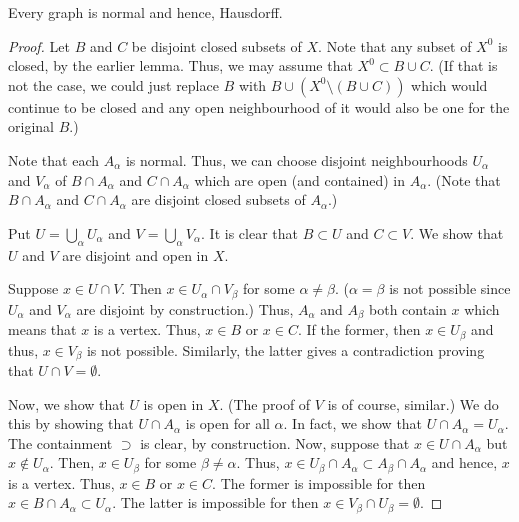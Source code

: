 \documentclass[12pt]{article}
\begin{document}
\begin{lem} 
	Every graph is normal and hence, Hausdorff.
\end{lem}
\begin{proof} 
	Let $B$ and $C$ be disjoint closed subsets of $X.$ Note that any subset of $X^0$ is closed, by the earlier lemma. Thus, we may assume that $X^0 \subset B \cup C.$ (If that is not the case, we could just replace $B$ with $B \cup (X^0 \setminus (B \cup C))$ which would continue to be closed and any open neighbourhood of it would also be one for the original $B.$)

	Note that each $A_\alpha$ is normal. Thus, we can choose disjoint neighbourhoods $U_\alpha$ and $V_\alpha$ of $B\cap A_\alpha$ and $C\cap A_\alpha$ which are open (and contained) in $A_\alpha.$ (Note that $B\cap A_\alpha$ and $C \cap A_\alpha$ are disjoint closed subsets of $A_\alpha.$)

	Put $U = \bigcup_{\alpha} U_\alpha$ and $V = \bigcup_{\alpha} V_\alpha.$ It is clear that $B \subset U$ and $C \subset V.$ We show that $U$ and $V$ are disjoint and open in $X.$

	Suppose $x \in U \cap V.$ Then $x \in U_\alpha \cap V_\beta$ for some $\alpha \neq \beta.$ ($\alpha = \beta$ is not possible since $U_\alpha$ and $V_\alpha$ are disjoint by construction.) Thus, $A_\alpha$ and $A_\beta$ both contain $x$ which means that $x$ is a vertex. Thus, $x \in B$ or $x \in C.$ If the former, then $x \in U_\beta$ and thus, $x \in V_\beta$ is not possible. Similarly, the latter gives a contradiction proving that $U \cap V = \emptyset.$

	Now, we show that $U$ is open in $X.$ (The proof of $V$ is of course, similar.) We do this by showing that $U \cap A_\alpha$ is open for all $\alpha.$ In fact, we show that $U \cap A_\alpha = U_\alpha.$ The containment $\supset$ is clear, by construction. Now, suppose that $x \in U \cap A_\alpha$ but $x \notin U_\alpha.$ Then, $x \in U_\beta$ for some $\beta \neq \alpha.$ 
	Thus, $x \in U_\beta \cap A_\alpha \subset A_\beta \cap A_\alpha$ and hence, $x$ is a vertex. Thus, $x \in B$ or $x \in C.$ The former is impossible for then $x \in B \cap A_\alpha \subset U_\alpha.$ The latter is impossible for then $x \in V_\beta \cap U_\beta = \emptyset.$  
\end{proof}
\end{document}

